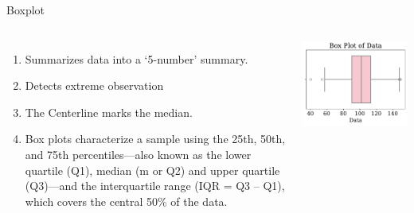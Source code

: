 \documentclass[aspectratio=169,xcolor=dvipsnames,svgnames,x11names,fleqn]{beamer}
\begin{document}
\begin{frame}{Boxplot}
\begin{columns}[c]
\begin{enumerate}
    \item Summarizes data into a `5-number' summary.
    \item Detects extreme observation
    \item The Centerline marks the median.
    \item Box plots characterize a sample using the 25th, 50th, and 75th
percentiles—also known as the lower quartile (Q1), median (m or
Q2) and upper quartile (Q3)—and the interquartile range (IQR =
Q3 – Q1), which covers the central 50\% of the data.
\end{enumerate}
 \includegraphics[width=1.09\textwidth]{figures/boxplot.pdf}
\end{columns}
\end{frame}


\end{document}
